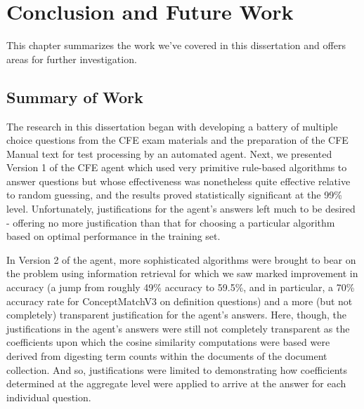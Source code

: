  

\chapter{Conclusion and Future Work}

This chapter summarizes the work we’ve covered in this dissertation and offers areas for further investigation.

\section{Summary of Work}

The research in this dissertation began with developing a battery of multiple choice questions from the CFE exam materials and the preparation of the CFE Manual text for test processing by an automated agent. Next, we presented Version 1 of the CFE agent which used very primitive rule-based algorithms to answer questions but whose effectiveness was nonetheless quite effective relative to random guessing, and the results proved statistically significant at the 99\% level. Unfortunately, justifications for the agent’s answers left much to be desired - offering no more justification than that for choosing a particular algorithm based on optimal performance in the training set.  

In Version 2 of the agent, more sophisticated algorithms were brought to bear on the problem using information retrieval for which we saw marked improvement in accuracy (a jump from roughly 49\% accuracy to 59.5\%, and in particular, a 70\% accuracy rate for ConceptMatchV3 on definition questions) and a more (but not completely) transparent justification for the agent’s answers. Here, though, the justifications in the agent’s answers were still not completely transparent as the coefficients upon which the cosine similarity computations were based were derived from digesting term counts within the documents of the document collection. And so, justifications were limited to demonstrating how coefficients determined at the aggregate level were applied to arrive at the answer for each individual question.

